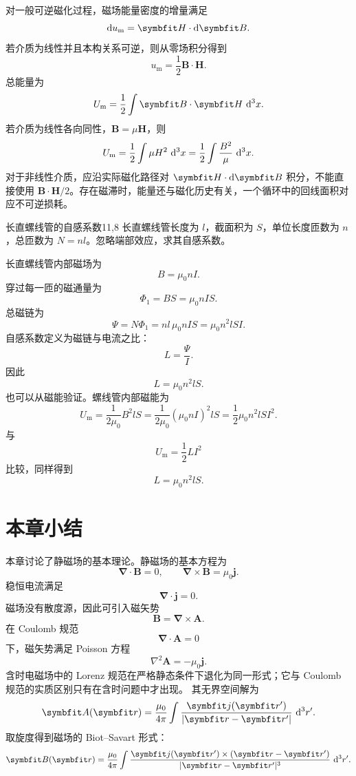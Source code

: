 对一般可逆磁化过程，磁场能量密度的增量满足
\begin{equation}
	\dif u_{\mathrm{m}}
	=
	\bm{H}\cdot\dif\bm{B}.
	\label{eq:11:magnetic-energy-increment}
\end{equation}
若介质为线性并且本构关系可逆，则从零场积分得到
\[
u_{\mathrm{m}}
=
\frac{1}{2}\bm{B}\cdot\bm{H}.
\]
总能量为
\[
U_{\mathrm{m}}
=
\frac{1}{2}
\int
\bm{B}\cdot\bm{H}
\,\dif^{3}x.
\]
若介质为线性各向同性，$\bm{B}=\mu\bm{H}$，则
\[
U_{\mathrm{m}}
=
\frac{1}{2}
\int
\mu H^{2}
\,\mathop{}\!\mathrm{d}^{3}x
=
\frac{1}{2}
\int
\frac{B^{2}}{\mu}
\,\mathop{}\!\mathrm{d}^{3}x.
\]
对于非线性介质，应沿实际磁化路径对
$\bm{H}\cdot\dif\bm{B}$ 积分，不能直接使用
$\bm{B}\cdot\bm{H}/2$。存在磁滞时，能量还与磁化历史有关，一个循环中的回线面积对应不可逆损耗。

\begin{example}{长直螺线管的自感系数}{11,8}
	长直螺线管长度为 $l$，截面积为 $S$，单位长度匝数为 $n$，总匝数为 $N=nl$。忽略端部效应，求其自感系数。
	
	\begin{solution}
		长直螺线管内部磁场为
		\[
		B=\mu_{0}nI.
		\]
		穿过每一匝的磁通量为
		\[
		\Phi_{1}=BS=\mu_{0}nIS.
		\]
		总磁链为
		\[
		\Psi=N\Phi_{1}
		=
		nl\,\mu_{0}nIS
		=
		\mu_{0}n^{2}lSI.
		\]
		自感系数定义为磁链与电流之比：
		\[
		L=\frac{\Psi}{I}.
		\]
		因此
		\[
		L
		=
		\mu_{0}n^{2}lS.
		\]
		也可以从磁能验证。螺线管内部磁能为
		\[
		U_{\mathrm{m}}
		=
		\frac{1}{2\mu_{0}}B^{2}lS
		=
		\frac{1}{2\mu_{0}}(\mu_{0}nI)^{2}lS
		=
		\frac{1}{2}\mu_{0}n^{2}lSI^{2}.
		\]
		与
		\[
		U_{\mathrm{m}}=\frac{1}{2}LI^{2}
		\]
		比较，同样得到
		\[
		L=\mu_{0}n^{2}lS.
		\]
	\end{solution}
\end{example}


\section{本章小结}

本章讨论了静磁场的基本理论。静磁场的基本方程为
\[
\bm{\nabla}\cdot\bm{B}=0,
\qquad
\bm{\nabla}\times\bm{B}
=
\mu_{0}\bm{j}.
\]
稳恒电流满足
\[
\bm{\nabla}\cdot\bm{j}=0.
\]
磁场没有散度源，因此可引入磁矢势
\[
\bm{B}
=
\bm{\nabla}\times\bm{A}.
\]
在 Coulomb 规范
\[
\bm{\nabla}\cdot\bm{A}=0
\]
下，磁矢势满足 Poisson 方程
\[
\nabla^{2}\bm{A}
=
-\mu_{0}\bm{j}.
\]
含时电磁场中的 Lorenz 规范在严格静态条件下退化为同一形式；它与 Coulomb 规范的实质区别只有在含时问题中才出现。
其无界空间解为
\[
\bm{A}(\bm{r})
=
\frac{\mu_{0}}{4\pi}
\int
\frac{\bm{j}(\bm{r}')}{|\bm{r}-\bm{r}'|}
\,\dif^{3}r'.
\]
取旋度得到磁场的 Biot--Savart 形式：
\[
\bm{B}(\bm{r})
=
\frac{\mu_{0}}{4\pi}
\int
\frac{
	\bm{j}(\bm{r}')\times(\bm{r}-\bm{r}')
}{
	|\bm{r}-\bm{r}'|^{3}
}
\,\dif^{3}r'.
\]

